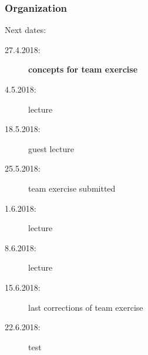 





\date{27.4.2018}



\renewcommand{\enquote}[1]{\emph{``#1''}} %

\begin{frame}
	\titlepage
	\doclicenseThis
\end{frame}

\begin{frame}
	\frametitle{Organization}
	Next dates:
	\begin{description}
		\item[27.4.2018:] \textbf{concepts for team exercise}
		\item[4.5.2018:] lecture
		\item[18.5.2018:] guest lecture
		\item[25.5.2018:] team exercise submitted
		\item[1.6.2018:] lecture
		\item[8.6.2018:] lecture
		\item[15.6.2018:] last corrections of team exercise
		\item[22.6.2018:] test
	\end{description}
\end{frame}


